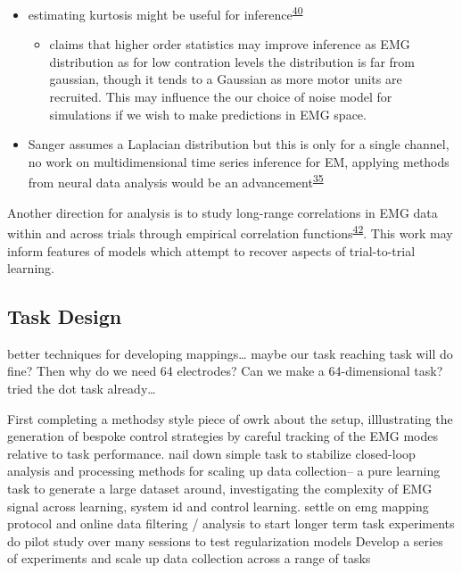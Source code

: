 \documentclass[
  a4paper,
]{article}
\providecommand{\tightlist}{%
  \setlength{\itemsep}{0pt}\setlength{\parskip}{0pt}}
\begin{document}
\begin{itemize}
\tightlist
\item
  estimating kurtosis might be useful for
  inference\textsuperscript{\protect\hyperlink{ref-nazarpourNoteProbabilityDistribution2013}{40}}

  \begin{itemize}
  \tightlist
  \item
    claims that higher order statistics may improve inference as EMG
    distribution as for low contration levels the distribution is far
    from gaussian, though it tends to a Gaussian as more motor units are
    recruited. This may influence the our choice of noise model for
    simulations if we wish to make predictions in EMG space.
  \end{itemize}
\item
  Sanger assumes a Laplacian distribution but this is only for a single
  channel, no work on multidimensional time series inference for EM,
  applying methods from neural data analysis would be an
  advancement\textsuperscript{\protect\hyperlink{ref-sangerBayesianFilteringMyoelectric2007}{35}}
\end{itemize}

Another direction for analysis is to study long-range correlations in
EMG data within and across trials through empirical correlation
functions\textsuperscript{\protect\hyperlink{ref-crevecoeurGoldstandardApproachAddress2010}{42}}.
This work may inform features of models which attempt to recover aspects
of trial-to-trial learning.

\hypertarget{task-design}{%
\subsection{Task Design}\label{task-design}}

better techniques for developing mappings\ldots{} maybe our task
reaching task will do fine? Then why do we need 64 electrodes? Can we
make a 64-dimensional task? tried the dot task already\ldots{}

First completing a methodsy style piece of owrk about the setup,
illlustrating the generation of bespoke control strategies by careful
tracking of the EMG modes relative to task performance. nail down simple
task to stabilize closed-loop analysis and processing methods for
scaling up data collection-- a pure learning task to generate a large
dataset around, investigating the complexity of EMG signal across
learning, system id and control learning. settle on emg mapping protocol
and online data filtering / analysis to start longer term task
experiments do pilot study over many sessions to test regularization
models Develop a series of experiments and scale up data collection
across a range of tasks
\end{document}
